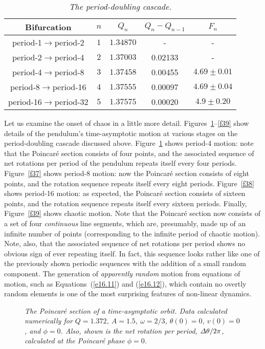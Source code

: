 \begin{table}
\centering
\begin{tabular}{ccccc}\hline
Bifurcation & $n$ & $Q_n$ & $Q_{n} - Q_{n-1}$ & $F_n$\\\hline
period-1$\rightarrow$period-2 & $1$ & $1.34870$ & - & - \\
period-2$\rightarrow$period-4 & $2$ & $1.37003$ & 0.02133 & - \\
period-4$\rightarrow$period-8 & $3$ & $1.37458$ & 0.00455 & $4.69\pm 0.01$ \\
period-8$\rightarrow$period-16 & $4$ & $1.37555$ & 0.00097 & $4.69\pm 0.04$ \\
period-16$\rightarrow$period-32 & $5$ & $1.37575$ & 0.00020 & $4.9\pm 0.20$ \\
\hline
\end{tabular}
\caption{\em The period-doubling cascade.}\label{tpd}
\end{table}

Let us examine the onset of chaos in a little more detail. Figures~\ref{f36}--\ref{f39}
show details of the pendulum's time-asymptotic motion at various stages on the
period-doubling cascade discussed above. Figure~\ref{f36} shows period-4 motion:
note that the  Poincar\'{e} section consists of four points, and the associated sequence of
net rotations per period of the pendulum repeats itself every four periods.
 Figure~\ref{f37} shows period-8 motion:
now the Poincar\'{e} section consists of eight points, and the rotation sequence
 repeats itself every eight periods. Figure~\ref{f38} shows period-16 motion:
as expected, the Poincar\'{e} section consists of sixteen points, and the rotation sequence
 repeats itself every sixteen periods. Finally, Figure~\ref{f39} shows chaotic motion. Note that
the Poincar\'{e} section now consists of a set of four {\em continuous}\/ line segments, which are, presumably, made
up of an infinite number of points (corresponding to the infinite period of chaotic motion). 
Note, also, that the associated sequence of net rotations per period shows no obvious sign of ever
repeating itself. In fact, this sequence looks rather like one of the previously shown periodic
sequences with the addition of a small random component. The generation of {\em apparently
random}\/ motion from   equations of motion, such as Equations~(\ref{e16.11}) and
(\ref{e16.12}), which contain no overtly random elements is one of the most surprising features of
non-linear dynamics.

\begin{figure}
\centerline{}
\caption{\em The Poincar\'{e} section of a time-asymptotic orbit. Data 
calculated numerically for $Q=1.372$, $A=1.5$, $\omega=2/3$,
$\theta(0)=0$, $v(0)=0$, and $\phi=0$. Also, shown is the
net rotation per period, ${\mit\Delta}\theta/2\pi$,  calculated at the Poincar\'{e} phase
$\phi=0$.}\label{f36}
\end{figure}

